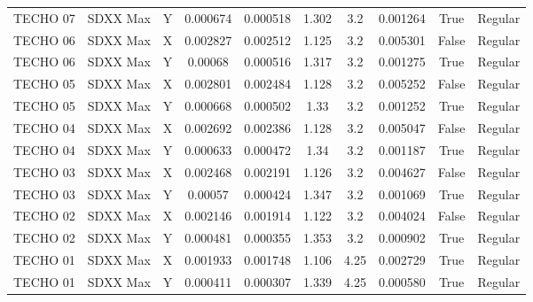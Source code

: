\documentclass{article}%
\begin{document}
\begin{table}[H]
{\begin{tabular}{cccccccccc}
TECHO 07 & SDXX Max & Y & 0.000674 & 0.000518 & 1.302 & 3.2 & 0.001264 & True & Regular \\
TECHO 06 & SDXX Max & X & 0.002827 & 0.002512 & 1.125 & 3.2 & 0.005301 & False & Regular \\
TECHO 06 & SDXX Max & Y & 0.00068 & 0.000516 & 1.317 & 3.2 & 0.001275 & True & Regular \\
TECHO 05 & SDXX Max & X & 0.002801 & 0.002484 & 1.128 & 3.2 & 0.005252 & False & Regular \\
TECHO 05 & SDXX Max & Y & 0.000668 & 0.000502 & 1.33 & 3.2 & 0.001252 & True & Regular \\
TECHO 04 & SDXX Max & X & 0.002692 & 0.002386 & 1.128 & 3.2 & 0.005047 & False & Regular \\
TECHO 04 & SDXX Max & Y & 0.000633 & 0.000472 & 1.34 & 3.2 & 0.001187 & True & Regular \\
TECHO 03 & SDXX Max & X & 0.002468 & 0.002191 & 1.126 & 3.2 & 0.004627 & False & Regular \\
TECHO 03 & SDXX Max & Y & 0.00057 & 0.000424 & 1.347 & 3.2 & 0.001069 & True & Regular \\
TECHO 02 & SDXX Max & X & 0.002146 & 0.001914 & 1.122 & 3.2 & 0.004024 & False & Regular \\
TECHO 02 & SDXX Max & Y & 0.000481 & 0.000355 & 1.353 & 3.2 & 0.000902 & True & Regular \\
TECHO 01 & SDXX Max & X & 0.001933 & 0.001748 & 1.106 & 4.25 & 0.002729 & True & Regular \\
TECHO 01 & SDXX Max & Y & 0.000411 & 0.000307 & 1.339 & 4.25 & 0.000580 & True & Regular \\
\bottomrule
\end{tabular}
}%
\end{table}

%
\end{document}
